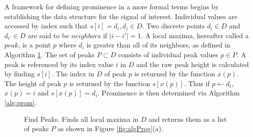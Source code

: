 A framework for defining prominence in a more formal terms begins by establishing the data structure for the signal of interest. Individual values are accessed by index such that $s[i]=d_i, d_i\in D$. Two discrete points $d_i \in D$ and $d_{i'} \in D$ are said to be $neighbors$ if $|i-i'| = 1$. A local maxima, hereafter called a $peak$, is a point $p$ where $d_i$ is greater than all of its neighbors, as defined in Algorithm \ref{alg:peaks}. The set of peaks $P \subset D$ consists of individual peak values $p \in P$. A peak is referenced by its index value $i$ in $D$ and the raw peak height is calculated by finding $s[i]$. The index in $D$ of peak $p$ is returned by the function $x(p)$. The height of peak $p$ is returned by the function $s[x(p)]$. Thus if $p \leftarrow d_i$, $x(p)=i$ and $s[x(p)]=d_i$. Prominence is then determined via Algorithm \ref{alg:prom}. 


\begin{figure}
\begin{algorithm}[H]
\DontPrintSemicolon
{}
\caption{Find Peaks. Finds all local maxima in $D$ and returns them as a list of peaks $P$ as shown in Figure \ref{fig:algProg}(a). \label{alg:peaks}}
\end{algorithm}
\end{figure}

